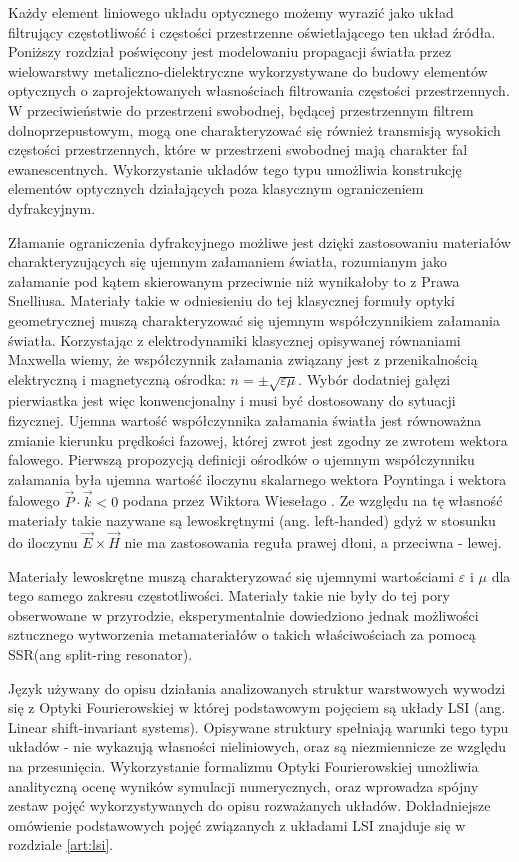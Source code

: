 Każdy element liniowego układu optycznego możemy wyrazić jako układ filtrujący częstotliwość i częstości przestrzenne oświetlającego ten układ źródła. Poniższy rozdział poświęcony jest modelowaniu propagacji światła przez wielowarstwy metaliczno-dielektryczne wykorzystywane do  budowy elementów optycznych o zaprojektowanych własnościach filtrowania częstości przestrzennych. W przeciwieństwie do przestrzeni swobodnej, będącej przestrzennym filtrem dolnoprzepustowym, mogą one charakteryzować się również transmisją wysokich częstości przestrzennych, które w przestrzeni swobodnej mają charakter fal ewanescentnych. Wykorzystanie układów tego typu umożliwia konstrukcję elementów optycznych działających poza klasycznym ograniczeniem dyfrakcyjnym.

Złamanie ograniczenia dyfrakcyjnego możliwe jest dzięki zastosowaniu materiałów charakteryzujących się ujemnym załamaniem światła, rozumianym jako załamanie pod kątem skierowanym przeciwnie niż wynikałoby to z Prawa Snelliusa. Materiały takie w odniesieniu do tej klasycznej formuły optyki geometrycznej muszą charakteryzować się ujemnym współczynnikiem załamania światła. Korzystając z elektrodynamiki klasycznej opisywanej równaniami Maxwella wiemy, że współczynnik załamania związany jest z przenikalnością elektryczną i magnetyczną ośrodka: $n = \pm \sqrt{ \varepsilon \mu}$. Wybór dodatniej gałęzi pierwiastka jest więc konwencjonalny i musi być dostosowany do sytuacji fizycznej. Ujemna wartość współczynnika załamania światła jest równoważna zmianie kierunku prędkości fazowej, której zwrot jest zgodny ze zwrotem wektora falowego. Pierwszą propozycją definicji ośrodków o ujemnym współczynniku załamania była ujemna wartość iloczynu skalarnego wektora Poyntinga i wektora falowego $\vec{P} \cdot \vec{k} < 0$ podana przez Wiktora Wiesełago \cite{veselago1968electrodynamics}. Ze względu na tę własność materiały takie nazywane są lewoskrętnymi (ang. left-handed) gdyż w stosunku do iloczynu $\vec{E} \times \vec{H}$ nie ma zastosowania reguła prawej dłoni, a przeciwna - lewej.

Materiały lewoskrętne muszą charakteryzować się ujemnymi wartościami $\varepsilon$ i $\mu$ dla tego samego zakresu częstotliwości. Materiały takie nie były do tej pory obserwowane w przyrodzie, eksperymentalnie dowiedziono jednak możliwości sztucznego wytworzenia metamateriałów o takich właściwościach\cite{PhysRevLett.84.4184} za pomocą SSR(ang split-ring resonator). 

Język używany do opisu działania analizowanych struktur warstwowych wywodzi się z Optyki Fourierowskiej w której podstawowym pojęciem są układy LSI (ang. Linear shift-invariant systems). Opisywane struktury spełniają warunki tego typu układów - nie wykazują własności nieliniowych, oraz są niezmiennicze ze względu na przesunięcia. Wykorzystanie formalizmu Optyki Fourierowskiej umożliwia analityczną ocenę wyników symulacji numerycznych, oraz wprowadza spójny zestaw pojęć wykorzystywanych do opisu rozważanych układów. Dokładniejsze omówienie podstawowych pojęć związanych z układami LSI znajduje się w rozdziale \ref{art:lsi}.


